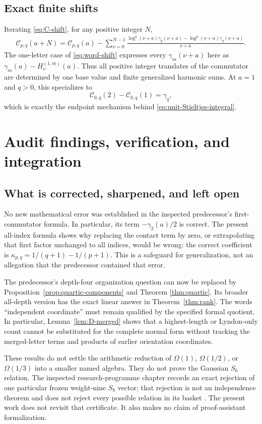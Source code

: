 \documentclass[11pt]{article}
\numberwithin{equation}{section}
\theoremstyle{definition}
\begin{document}
\subsection{Exact finite shifts}
Iterating \eqref{eq:C-shift}, for any positive integer $N$,
\begin{align}\label{eq:finite-shift}
 \mathcal C_{p,q}(a+N)=\mathcal C_{p,q}(a)
 -\sum_{\nu=0}^{N-1}
 \frac{\log^q(\nu+a)\gamma_p(\nu+a)
       -\log^p(\nu+a)\gamma_q(\nu+a)}{\nu+a}.
\end{align}
The one-letter case of \eqref{eq:word-shift} expresses every
$\gamma_m(\nu+a)$ here as $\gamma_m(a)-H_\nu^{(1,m)}(a)$.
Thus all positive integer translates of the commutator are determined by
one base value and finite generalized harmonic sums. At $a=1$ and $q>0$,
this specializes to
\[
 \mathcal C_{0,q}(2)-\mathcal C_{0,q}(1)=\gamma_q,
\]
which is exactly the endpoint mechanism behind
\eqref{eq:unit-Stieltjes-integral}.

\section{Audit findings, verification, and integration}
\label{sec:audit}
\subsection{What is corrected, sharpened, and left open}
No new mathematical error was established in the inspected predecessor's
first-commutator formula. In particular, its term $-\gamma_2(a)/2$ is
correct. The present all-index formula shows why replacing the contact
term by zero, or extrapolating that first factor unchanged to all indices,
would be wrong: the correct coefficient is
$\kappa_{p,q}=1/(q+1)-1/(p+1)$. This is a safeguard for generalization,
not an allegation that the predecessor contained that error.

The predecessor's depth-four organization question can now be replaced
by Proposition~\ref{prop:quartic-components} and Theorem
\ref{thm:quartic}. Its broader all-depth version has the exact linear
answer in Theorem~\ref{thm:rank}. The words ``independent coordinate''
must remain qualified by the specified formal quotient. In particular,
Lemma~\ref{lem:D-merged} shows that a highest-length or Lyndon-only count
cannot be substituted for the complete normal form without tracking the
merged-letter terms and products of earlier orientation coordinates.

These results do not settle the arithmetic reduction of $\Omega(1)$,
$\Omega(1/2)$, or $\Omega(1/3)$ into a smaller named algebra. They do
not prove the Gaussian $S_6$ relation. The inspected research-programme
chapter records an exact rejection of one particular frozen weight-nine
$S_8$ vector; that rejection is not an independence theorem and does not
reject every possible relation in its basket \cite{repo-discovery}.
The present work does not revisit that certificate. It also makes no
claim of proof-assistant formalization.
\end{document}
